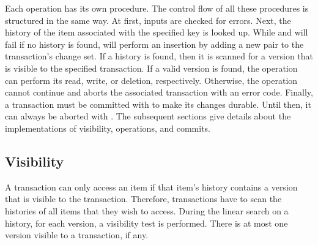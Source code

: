 
%

Each operation has its own procedure. The control flow of all these procedures is structured in the same way. At first, inputs are checked for errors. Next, the history of the item associated with the specified key is looked up. While  and  will fail if no history is found,  will perform an insertion by adding a new pair to the transaction's change set. If a history is found, then it is scanned for a version that is visible to the specified transaction. If a valid version is found, the operation can perform its read, write, or deletion, respectively. Otherwise, the operation cannot continue and aborts the associated transaction with an error code. Finally, a transaction must be committed with  to make its changes durable. Until then, it can always be aborted with . The subsequent sections give details about the implementations of visibility, operations, and commits.

\subsection{Visibility}
\label{ch:impl-vsb}

A transaction can only access an item if that item's history contains a version that is visible to the transaction. Therefore, transactions have to scan the histories of all items that they wish to access. During the linear search on a history, for each version, a visibility test is performed. There is at most one version visible to a transaction, if any.

